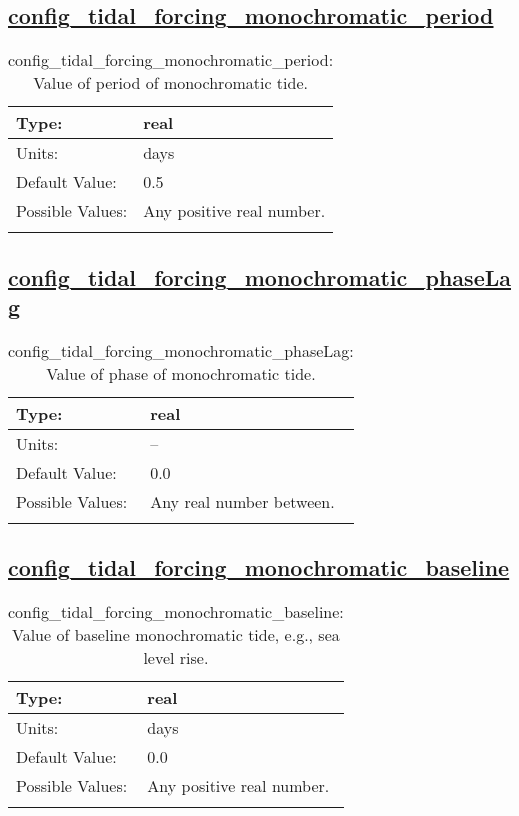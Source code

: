 \subsection[config\_tidal\_forcing\_monochromatic\_period]{\hyperref[sec:nm_tab_tidal_forcing]{config\_tidal\_forcing\_monochromatic\_period}}
\label{subsec:nm_sec_config_tidal_forcing_monochromatic_period}
\begin{center}
\begin{longtable}{| p{2.0in} || p{4.0in} |}
    \hline
    Type: & real \\
    \hline
    Units: & \si{days} \\
    \hline
    Default Value: & 0.5 \\
    \hline
    Possible Values: & Any positive real number. \\
    \hline
    \caption{config\_tidal\_forcing\_monochromatic\_period: Value of period of monochromatic tide.}
\end{longtable}
\end{center}
\subsection[config\_tidal\_forcing\_monochromatic\_phaseLag]{\hyperref[sec:nm_tab_tidal_forcing]{config\_tidal\_forcing\_monochromatic\_phaseLag}}
\label{subsec:nm_sec_config_tidal_forcing_monochromatic_phaseLag}
\begin{center}
\begin{longtable}{| p{2.0in} || p{4.0in} |}
    \hline
    Type: & real \\
    \hline
    Units: & -- \\
    \hline
    Default Value: & 0.0 \\
    \hline
    Possible Values: & Any real number between. \\
    \hline
    \caption{config\_tidal\_forcing\_monochromatic\_phaseLag: Value of phase of monochromatic tide.}
\end{longtable}
\end{center}
\subsection[config\_tidal\_forcing\_monochromatic\_baseline]{\hyperref[sec:nm_tab_tidal_forcing]{config\_tidal\_forcing\_monochromatic\_baseline}}
\label{subsec:nm_sec_config_tidal_forcing_monochromatic_baseline}
\begin{center}
\begin{longtable}{| p{2.0in} || p{4.0in} |}
    \hline
    Type: & real \\
    \hline
    Units: & \si{days} \\
    \hline
    Default Value: & 0.0 \\
    \hline
    Possible Values: & Any positive real number. \\
    \hline
    \caption{config\_tidal\_forcing\_monochromatic\_baseline: Value of baseline monochromatic tide, e.g., sea level rise.}
\end{longtable}
\end{center}
